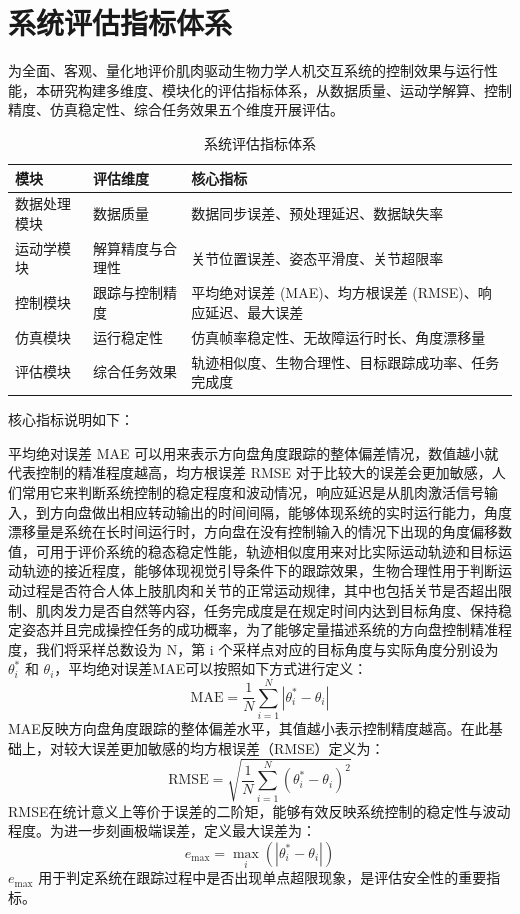 \section{系统评估指标体系}
为全面、客观、量化地评价肌肉驱动生物力学人机交互系统的控制效果与运行性能，本研究构建多维度、模块化的评估指标体系，从数据质量、运动学解算、控制精度、仿真稳定性、综合任务效果五个维度开展评估。
\begin{table}[htbp]
  \centering
  \caption{系统评估指标体系}
  \label{tab:eval_index}
  \begin{tabular}{p{2.5cm}p{3.5cm}p{8cm}}
    \toprule
   模块 & 评估维度 & 核心指标 \\
    \midrule
    数据处理模块 & 数据质量 & 数据同步误差、预处理延迟、数据缺失率 \\
    运动学模块 & 解算精度与合理性 & 关节位置误差、姿态平滑度、关节超限率 \\
    控制模块 & 跟踪与控制精度 & 平均绝对误差 (MAE)、均方根误差 (RMSE)、响应延迟、最大误差 \\
    仿真模块 & 运行稳定性 & 仿真帧率稳定性、无故障运行时长、角度漂移量 \\
    评估模块 & 综合任务效果 & 轨迹相似度、生物合理性、目标跟踪成功率、任务完成度 \\
    \bottomrule
  \end{tabular}
\end{table}

核心指标说明如下：

平均绝对误差 MAE 可以用来表示方向盘角度跟踪的整体偏差情况，数值越小就代表控制的精准程度越高，均方根误差 RMSE 对于比较大的误差会更加敏感，人们常用它来判断系统控制的稳定程度和波动情况，响应延迟是从肌肉激活信号输入，到方向盘做出相应转动输出的时间间隔，能够体现系统的实时运行能力，角度漂移量是系统在长时间运行时，方向盘在没有控制输入的情况下出现的角度偏移数值，可用于评价系统的稳态稳定性能，轨迹相似度用来对比实际运动轨迹和目标运动轨迹的接近程度，能够体现视觉引导条件下的跟踪效果，生物合理性用于判断运动过程是否符合人体上肢肌肉和关节的正常运动规律，其中也包括关节是否超出限制、肌肉发力是否自然等内容，任务完成度是在规定时间内达到目标角度、保持稳定姿态并且完成操控任务的成功概率，为了能够定量描述系统的方向盘控制精准程度，我们将采样总数设为 N，第 i 个采样点对应的目标角度与实际角度分别设为 $\theta_i^*$ 和 $\theta_i$，平均绝对误差MAE可以按照如下方式进行定义：
\begin{equation}
\text{MAE} = \frac{1}{N} \sum_{i=1}^{N} |\theta_i^{*} - \theta_i|
\label{eq:mae}
\end{equation}
MAE反映方向盘角度跟踪的整体偏差水平，其值越小表示控制精度越高。在此基础上，对较大误差更加敏感的均方根误差（RMSE）定义为：
\begin{equation}
\text{RMSE} = \sqrt{\frac{1}{N} \sum_{i=1}^{N} \left( \theta_i^{*} - \theta_i \right)^2}
\label{eq:rmse}
\end{equation}
RMSE在统计意义上等价于误差的二阶矩，能够有效反映系统控制的稳定性与波动程度。为进一步刻画极端误差，定义最大误差为：
\begin{equation}
e_{\max} = \max_i \left( \left| \theta_i^{*} - \theta_i \right| \right)
\label{eq:max-error}
\end{equation}
$e_{\max}$ 用于判定系统在跟踪过程中是否出现单点超限现象，是评估安全性的重要指标。

